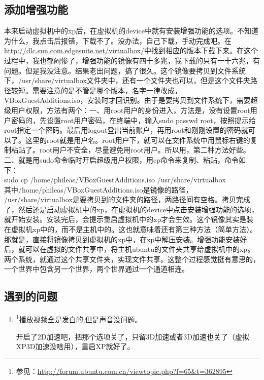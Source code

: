 \subsection{添加增强功能}
    本来启动虚拟机中的xp后，在虚拟机的device中就有安装增强功能的选项。不知道为什么，我点击后报错，下载不了。没办法，自己下载，手动完成吧。在\url{http://dlc.sun.com.edgesuite.net/virtualbox/}中找到相应的版本下载下来。在这个过程中，我也郁闷惨了，增强功能的镜像有四十多兆，我下载的只有一十六兆，有问题。但是我没注意。结果老出问题，搞了很久。这个镜像要拷贝到文件系统下，/usr/share/virtualbox文件夹中，还有一个文件夹也可以，但是这个文件夹路径较短。需要注意的是不管是哪个版本，名字一律改成， VBoxGuestAdditions.iso，安装时才回识别。由于是要拷贝到文件系统下，需要超级用户权限，方法有两个：一、用root用户的身份进入，方法是，没有设置root用户密码的，先设置root用户密码，在终端中，输入sudo passwd root，按照提示给root指定一个密码。最后用logout登出当前账户，再用root和刚刚设置的密码就可以了。这里的root就是用户名。root用户下，就可以在文件系统中用鼠标右键的复制粘贴了。root用户不安全，尽量避免用root用户。所以用，第二种方法好些。二、就是用sudo命令临时开启超级用户权限，用cp命令来复制、粘贴，命令如下：\\
sudo cp /home/phileas/VBoxGuestAdditions.iso /usr/share/virtualbox\\
其中/home/phileas/VBoxGuestAdditions.iso是镜像的路径，\\/usr/share/virtualbox是要拷贝到的文件夹的路径，两路径间有空格。拷贝完成了，然后还是启动虚拟机中的xp，在虚拟机的device中点击安装增强功能的选项，就开始安装。安装完后，会提示重启虚拟机中的xp才会生效。这个镜像其实是装在虚拟机xp中的，而不是主机中的。{\color{red}这也就意味着还有第三种方法（简单方法）。}那就是，直接将镜像拷贝到虚拟机的xp中，在xp中解压安装。增强功能安装好后，就可以在虚拟的文件共享中，将主机ubuntu的文件夹共享给虚拟机中的xp。两个系统，就通过这个共享文件夹，实现文件共享。这整个过程感觉挺有意思的，一个世界中包含另一个世界，两个世界通过一个通道相连。


\subsection{遇到的问题}
\begin{enumerate}
\item \footnote{参见：\url{http://forum.ubuntu.com.cn/viewtopic.php?f=65&t=362895}}播放视频全是发白的,但是声音没问题。

开启了2D加速吧，把那个选项关了，只留3D加速或者3D加速也关了（虚拟XP3D加速没啥用），重启XP就好了。
\end{enumerate}










